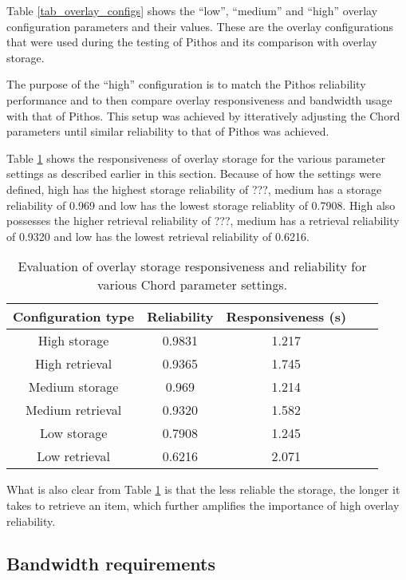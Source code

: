 Table \ref{tab_overlay_configs} shows the ``low'', ``medium'' and ``high'' overlay configuration parameters and their values. These are the overlay configurations that were used during the testing of Pithos and its comparison with overlay storage.

The purpose of the ``high'' configuration is to match the Pithos reliability performance and to then compare overlay responsiveness and bandwidth usage with that of Pithos. This setup was achieved by itteratively adjusting the Chord parameters until similar reliability to that of Pithos was achieved.

Table \ref{tab_overlay_rel_resp_results} shows the responsiveness of overlay storage for the various parameter settings as described earlier in this section. Because of how the settings were defined, high has the highest storage reliability of ???, medium has a storage reliability of 0.969 and low has the lowest storage reliablity of 0.7908. High also possesses the higher retrieval reliability of ???, medium has a retrieval reliability of 0.9320 and low has the lowest retrieval reliability of 0.6216.
%
\begin{table}[htbp]
\centering
\begin{tabular}{|c|c|c|c|c|}
\hline
Configuration type & Reliability & Responsiveness (s)\\
\hline
High storage     &   0.9831      &   1.217  \\
High retrieval   &   0.9365      &   1.745  \\
Medium storage   &   0.969       &   1.214  \\
Medium retrieval &   0.9320      &   1.582  \\
Low storage      &   0.7908      &   1.245  \\
Low retrieval    &   0.6216      &   2.071  \\
\hline
\end{tabular}
\caption{Evaluation of overlay storage responsiveness and reliability for various Chord parameter settings.}
\label{tab_overlay_rel_resp_results}
\end{table}

What is also clear from Table \ref{tab_overlay_rel_resp_results} is that the less reliable the storage, the longer it takes to retrieve an item, which further amplifies the importance of high overlay reliability.

\subsection{Bandwidth requirements}
\label{bandwidth_requirements}

